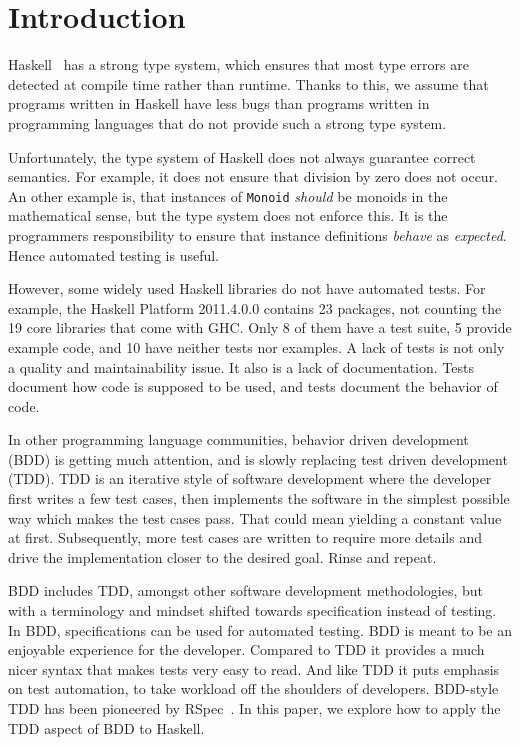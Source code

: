 \documentclass[preprint]{sigplanconf}
\begin{document}
\section{Introduction}
\label{sec:introduction}


Haskell~\cite{haskell} has a strong type system, which ensures that most type errors are
detected at compile time rather than runtime.  Thanks to this, we assume that
programs written in Haskell have less bugs than programs written in programming
languages that do not provide such a strong type system.

Unfortunately, the type system of Haskell does not always guarantee
correct semantics.
For example, it does not ensure that division by zero does not occur.
An other example is, that instances of {\tt Monoid} \emph{should} be
monoids in the mathematical sense, but the type system does not
enforce this.  It is the programmers responsibility to ensure that
instance definitions \emph{behave} as \emph{expected}.  Hence
automated testing is useful.

However, some widely used Haskell libraries do not have automated
tests.  For example, the Haskell Platform 2011.4.0.0 contains 23
packages, not counting the 19 core libraries that come with GHC.  Only
8 of them have a test suite, 5 provide example code, and 10 have
neither tests nor examples.  A lack of tests is not only a quality and
maintainability issue.  It also is a lack of documentation.  Tests
document how code is supposed to be used, and tests document the
behavior of code.

In other programming language communities, behavior driven development
(BDD) is getting much attention, and is slowly replacing test driven
development (TDD).  TDD is an iterative style of software development
where the developer first writes a few test cases, then implements the
software in the simplest possible way which makes the test cases pass.
That could mean yielding a constant value at first.  Subsequently,
more test cases are written to require more details and drive the
implementation closer to the desired goal.  Rinse and repeat.

BDD includes TDD, amongst other software development methodologies,
but with a terminology and mindset shifted towards
specification instead of testing.
In BDD, specifications can be used for
automated testing.
BDD is meant to be an enjoyable experience for the developer.
Compared to TDD it provides a much nicer syntax that
makes tests very easy to read.  And like TDD it puts emphasis on
test automation, to take workload off the shoulders of
developers.
BDD-style TDD has been pioneered by
RSpec~\cite{rspec}.  In this paper, we explore how to apply the TDD
aspect of BDD to Haskell.
\end{document}
